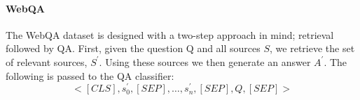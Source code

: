 \paragraph{WebQA}


The WebQA dataset \cite{chang_webqa_2021} is designed with a two-step approach in mind; retrieval followed by QA. First, given the question Q and all sources $S$, we retrieve the set of relevant sources, $S^\prime$. Using these sources we then generate an answer $A^\prime$. The following is passed to the QA classifier: 
\begin{equation}
    <[CLS], s^\prime_0, [SEP], \dots, s^\prime_n, [SEP], Q, [SEP]>
\end{equation}



